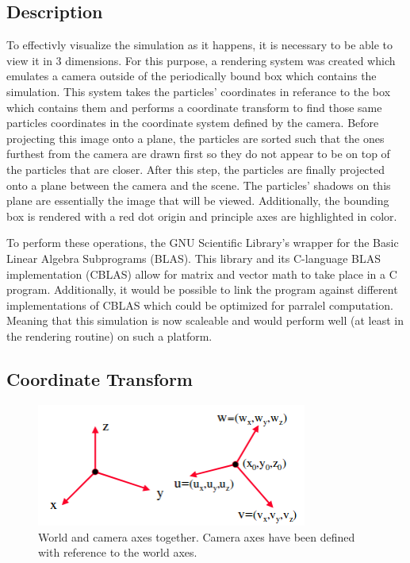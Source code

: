 \documentclass{article}
\begin{document}
\subsection{Description}
To effectivly visualize the simulation as it happens, it is necessary to be able to view it in 3 dimensions. For this
purpose, a rendering system was created which emulates a camera outside of the periodically bound box which contains
the simulation. This system takes the particles' coordinates in referance to the box which contains them and 
performs a coordinate transform to find those same particles coordinates in the coordinate 
system defined by the camera. Before projecting this image onto a plane,
the particles are sorted such that the ones furthest from the camera are drawn first so they do not
appear to be on top of the particles that are closer. After this step, the particles are finally projected 
onto a plane between the camera and the scene. The particles' shadows
on this plane are essentially the image that will be viewed. Additionally, the bounding box is 
rendered with a red dot origin and principle axes are highlighted in color.

To perform these operations, the GNU Scientific Library's wrapper for the Basic Linear Algebra Subprograms (BLAS).
This library and its C-language BLAS implementation (CBLAS) allow for matrix and vector math to take place in a 
C program. Additionally,
it would be possible to link the program against different implementations of CBLAS which could be optimized
for parralel computation. Meaning that this simulation is now scaleable and would perform well (at
 least in the rendering routine) on such a platform.

\subsection{Coordinate Transform}
\begin{figure}[!t]
\centering
\includegraphics[width=3.5in]{./imgs/axes}
\caption{World and camera axes together. Camera axes have been defined with reference to the world axes.}
\label{fig:axes}
\end{figure}
\end{document}
